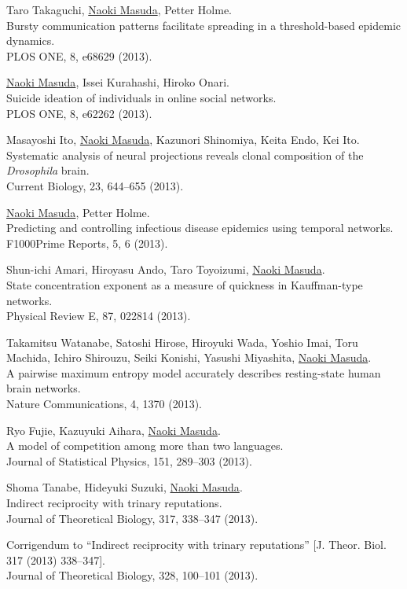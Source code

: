 \documentclass[11pt,letter]{article}
\renewenvironment{itemize}{
  \begin{list}{}{
    \setlength{\leftmargin}{1.5em}
    \setlength{\itemsep}{0.25em}
    \setlength{\parskip}{0pt}
    \setlength{\parsep}{0.25em}
  }
}{
  \end{list}
}
\begin{document}
\begin{etaremune}
\item Taro Takaguchi, \underline{Naoki Masuda}, Petter Holme.\\
Bursty communication patterns facilitate spreading in a threshold-based epidemic dynamics.\\
PLOS ONE, 8, e68629 (2013).

\item \underline{Naoki Masuda}, Issei Kurahashi, Hiroko Onari.\\
Suicide ideation of individuals in online social networks.\\
PLOS ONE, 8, e62262 (2013).

\item Masayoshi Ito, \underline{Naoki Masuda}, Kazunori Shinomiya, Keita Endo, Kei Ito.\\
Systematic analysis of neural projections reveals clonal composition of the \textit{Drosophila} brain.\\
Current Biology, 23, 644--655 (2013).

\item \underline{Naoki Masuda}, Petter Holme.\\
Predicting and controlling infectious disease epidemics using temporal networks.\\
F1000Prime Reports, 5, 6 (2013).

\item Shun-ichi Amari, Hiroyasu Ando, Taro Toyoizumi, \underline{Naoki Masuda}.\\
State concentration exponent as a measure of quickness in Kauffman-type networks.\\
Physical Review E, 87, 022814 (2013).

\item Takamitsu Watanabe, Satoshi Hirose, Hiroyuki Wada, Yoshio Imai, Toru Machida, Ichiro Shirouzu, Seiki Konishi, Yasushi Miyashita, \underline{Naoki Masuda}.\\
A pairwise maximum entropy model accurately describes resting-state human brain networks.\\
Nature Communications, 4, 1370 (2013).

\item Ryo Fujie, Kazuyuki Aihara, \underline{Naoki Masuda}.\\
A model of competition among more than two languages.\\
Journal of Statistical Physics, 151, 289--303 (2013).

\item Shoma Tanabe, Hideyuki Suzuki, \underline{Naoki Masuda}.\\
Indirect reciprocity with trinary reputations.\\
Journal of Theoretical Biology, 317, 338--347 (2013).
    \begin{itemize}
    \item Corrigendum to ``Indirect reciprocity with trinary reputations'' [J. Theor. Biol. 317 (2013) 338--347].\\
    Journal of Theoretical Biology, 328, 100--101 (2013).
    \end{itemize}


\end{etaremune}
\end{document}
